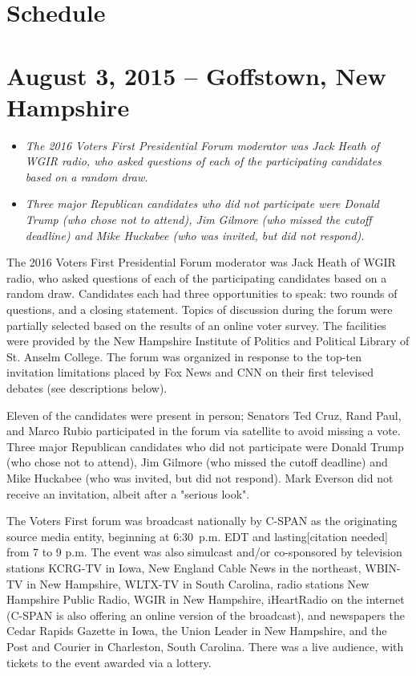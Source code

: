 \section{Schedule}\label{schedule-1}

\section{August 3, 2015 -- Goffstown, New
Hampshire}\label{august-3-2015-goffstown-new-hampshire}

\begin{itemize}
\item
  \emph{The 2016 Voters First Presidential Forum moderator was Jack
  Heath of WGIR radio, who asked questions of each of the participating
  candidates based on a random draw.}
\item
  \emph{Three major Republican candidates who did not participate were
  Donald Trump (who chose not to attend), Jim Gilmore (who missed the
  cutoff deadline) and Mike Huckabee (who was invited, but did not
  respond).}
\end{itemize}

The 2016 Voters First Presidential Forum moderator was Jack Heath of
WGIR radio, who asked questions of each of the participating candidates
based on a random draw. Candidates each had three opportunities to
speak: two rounds of questions, and a closing statement. Topics of
discussion during the forum were partially selected based on the results
of an online voter survey. The facilities were provided by the New
Hampshire Institute of Politics and Political Library of St. Anselm
College. The forum was organized in response to the top-ten invitation
limitations placed by Fox News and CNN on their first televised debates
(see descriptions below).

Eleven of the candidates were present in person; Senators Ted Cruz, Rand
Paul, and Marco Rubio participated in the forum via satellite to avoid
missing a vote. Three major Republican candidates who did not
participate were Donald Trump (who chose not to attend), Jim Gilmore
(who missed the cutoff deadline) and Mike Huckabee (who was invited, but
did not respond). Mark Everson did not receive an invitation, albeit
after a "serious look".

The Voters First forum was broadcast nationally by C-SPAN as the
originating source media entity, beginning at 6:30~p.m. EDT and
lasting{[}citation needed{]} from 7 to 9 p.m. The event was also
simulcast and/or co-sponsored by television stations KCRG-TV in Iowa,
New England Cable News in the northeast, WBIN-TV in New Hampshire,
WLTX-TV in South Carolina, radio stations New Hampshire Public Radio,
WGIR in New Hampshire, iHeartRadio on the internet (C-SPAN is also
offering an online version of the broadcast), and newspapers the Cedar
Rapids Gazette in Iowa, the Union Leader in New Hampshire, and the Post
and Courier in Charleston, South Carolina. There was a live audience,
with tickets to the event awarded via a lottery.

